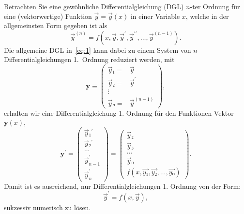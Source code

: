 
\NewDocumentCommand{}
\date{Ausgabe: Fr, 12.07.2019, Abgabe: Do, 18.07.2019, 18:00 Uhr}
\setcounter{question}{0}


\maketitle

Betrachten Sie eine gewöhnliche Differentialgleichung (DGL) $n$-ter Ordnung für eine (vektorwertige) Funktion $\vec{y} = \vec{y}(x)$ in einer Variable $x$, welche in der allgemeinsten Form gegeben ist als
\begin{equation}
  \label{eq:1}
  \vec{y}^{(n)} = f(x, \vec{y}, \vec{y}^\prime, \vec{y}^{\prime\prime}, …, \vec{y}^{(n - 1)}).
\end{equation}
Die allgemeine DGL in~\eqref{eq:1} kann dabei zu einem System von $n$ Differentialgleichungen 1.\ Ordnung reduziert werden, mit
\begin{equation}
  \label{eq:2}
  \symbf{y} ≡ \begin{pmatrix}
    \vec{y}₁ = & \vec{y}\\
    \vec{y}₂ = & \vec{y}^\prime\\
    \vdots & \\
    \vec{y}ₙ = & \vec{y}^{(n - 1)}
  \end{pmatrix},
\end{equation}
erhalten wir eine Differentialgleichung 1. Ordnung für den Funktionen-Vektor $\symbf{y}(x)$,
\begin{equation}
  \label{eq:3}
  \symbf{y}^{\prime} = \begin{pmatrix}
    \vec{y}₁^\prime \\
    \vec{y}₂^\prime \\
    … \\
    \vec{y}_{n - 1}^\prime \\
    \vec{y}_n^\prime
  \end{pmatrix}
  =
  \begin{pmatrix}
    \vec{y}₂\\
    \vec{y}₃\\
    … \\
    \vec{y}ₙ\\
    f(x, \vec{y₁}, \vec{y₂}, …, \vec{yₙ})
  \end{pmatrix}.
\end{equation}
Damit ist es ausreichend, nur Differentialgleichungen 1. Ordnung von der Form:
\begin{equation}
  \label{eq:3}
  \vec{y}^\prime = f(x, \vec{y}),
\end{equation}
sukzessiv numerisch zu lösen.

